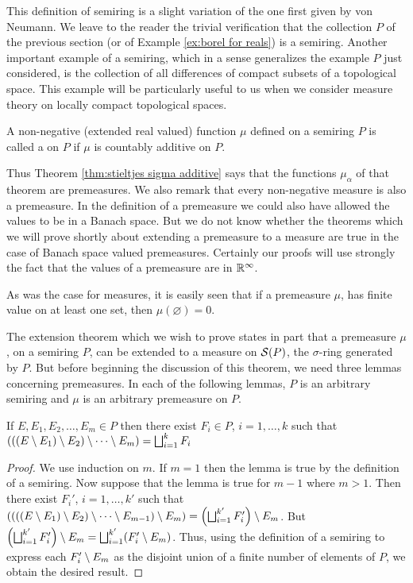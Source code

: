 This definition of semiring is a slight variation of the one first given by von Neumann. We leave to the reader the trivial verification that the collection $P$ of the previous section (or of Example \ref{ex:borel for reals}) is a semiring. Another important example of a semiring, which in a sense generalizes the example $P$ just considered, is the collection of all differences of compact subsets of a topological space. This example will be particularly useful to us when we consider measure theory on locally compact topological spaces.

\begin{definition}
A non-negative (extended real valued) function $\mu$ defined on a semiring $P$ is called a  on $P$ if $\mu$ is countably additive on $P$.
\end{definition}

Thus Theorem \ref{thm:stieltjes sigma additive} says that the functions $\mu_\alpha$ of that theorem are premeasures. We also remark that every non-negative measure is also a premeasure. In the definition of a premeasure we could also have allowed the values to be in a Banach space. But we do not know whether the theorems which we will prove shortly about extending a premeasure to a measure are true in the case of Banach space valued premeasures. Certainly our proofs will use strongly the fact that the values of a premeasure are in $\mathbb{R}^\infty$.

As was the case for measures, it is easily seen that if a premeasure $\mu$, has finite value on at least one set, then $\mu(\varnothing)=0$.

The extension theorem which we wish to prove states in part that a premeasure $\mu$, on a semiring $P$, can be extended to a measure on ${\cal S}(P)$, the $\sigma$-ring generated by $P$. But before beginning the discussion of this theorem, we need three lemmas concerning premeasures. In each of the following lemmas, $P$ is an arbitrary semiring and $\mu$ is an arbitrary premeasure on $P$.

\begin{lemma}\label{lem:repeated set diff}
If $E, E_1, E_2, \dots, E_m\in P$ then there exist $F_i \in P$, $i=1, \dots, k$ such that $(((E\setminus E_1)\setminus E_2)\setminus \cdots\setminus E_m)=\bigsqcup_{i=1}^k F_i$ 
\end{lemma}

\begin{proof}
We use induction on $m$. If $m=1$ then the lemma is true by the definition of a semiring. Now suppose that the lemma is true for $m-1$ where $m>1$. Then there exist $F_i'$, $i=1, \dots, k'$ such that $((((E\setminus E_1)\setminus E_2)\setminus\cdots\setminus E_{m-1})\setminus E_m)=\left(\bigsqcup_{i=1}^{k'}F_i'\right)\setminus E_m$. But $\left(\bigsqcup_{i=1}^{k'}F_i'\right)\setminus E_m=\bigsqcup_{i=1}^{k'}(F_i'\setminus E_m)$. Thus, using the definition of a semiring to express each $F_i'\setminus E_m$ as the disjoint union of a finite number of elements of $P$, we obtain the desired result.
\end{proof}


